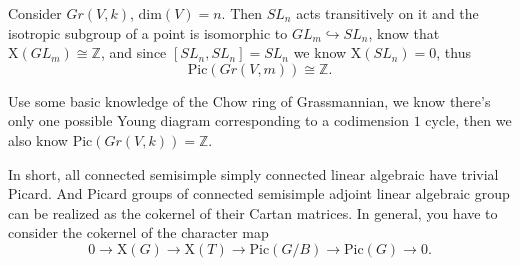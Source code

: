 \documentclass[../main.tex]{subfiles}
\begin{document}
\begin{example}
Consider $Gr(V,k)$, $\mathrm{dim}(V)=n$. Then $SL_{n}$ acts transitively on it and the isotropic subgroup of a point is isomorphic to $GL_{m}\hookrightarrow SL_{n}$, know that $\mathrm{X}(GL_{m})\cong \mathbb{Z}$, and since $[SL_{n},SL_{n}]=SL_{n}$ we know $\mathrm{X}(SL_{n})=0$, thus 
$$\mathrm{Pic}(Gr(V,m))\cong \mathbb{Z}.$$
\end{example}
\begin{remark}
Use some basic knowledge of the Chow ring of Grassmannian, we know there's only one possible Young diagram corresponding to a codimension $1$ cycle, then we also know $\mathrm{Pic}(Gr(V,k))=\mathbb{Z}$.
\end{remark}

\begin{example}

\end{example}

\begin{example}
In short, all connected semisimple simply connected linear algebraic have trivial Picard. And Picard groups of connected semisimple adjoint linear algebraic group can be realized as the cokernel of their Cartan matrices. In general, you have to consider the cokernel of the character map
$$0\rightarrow \mathrm{X}(G)\rightarrow \mathrm{X}(T)\rightarrow \mathrm{Pic}(G/B)\rightarrow \mathrm{Pic}(G)\rightarrow 0.$$
\end{example}
\end{document}
